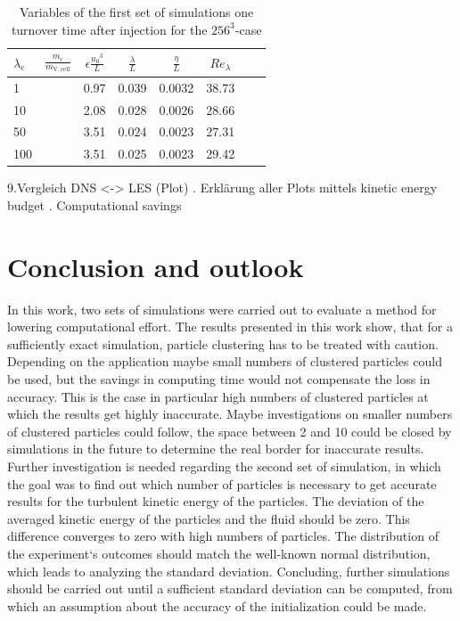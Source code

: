 \documentclass[11pt,a4paper,openany,oneside,parskip=half*]{article}
\begin{document}
\begin{table}[h]
\begin{center}
\begin{tabular}{l l | c c c c c c }
$\lambda_\mathrm{c}$& $\frac{m_\mathrm{c}}{m_\mathrm{V,cell}}$ & $\epsilon \frac{{u_0}^3}{L}$ & $\frac{\lambda}{L}$ & $\frac{\eta}{L} $ & $Re_\lambda$ \\
\hline
\hline
1 & & 0.97& 0.039 & 0.0032 & 38.73 &\\
10 & & 2.08 & 0.028 & 0.0026 & 28.66 &\\
50 & & 3.51 & 0.024 & 0.0023 & 27.31 &\\
100 & & 3.51 & 0.025 & 0.0023 & 29.42 &\\
\hline
\end{tabular}
\caption{Variables of the first set of simulations one turnover time after injection for the $256^3$-case}
\label{table_properties}
\end{center}
\end{table}
\newline
9.Vergleich DNS <-> LES (Plot)
\newline
{}. Erklärung aller Plots mittels kinetic energy budget
\newline
{}. Computational savings
\pagebreak
\section{Conclusion and outlook}
In this work, two sets of simulations were carried out to evaluate a method for lowering computational effort. 
\newline
The results presented in this work show, that for a sufficiently exact simulation, particle clustering has to be treated with caution. Depending on the application maybe small numbers of clustered particles could be used, but the savings in computing time would not compensate the loss in accuracy. This is the case in particular high numbers of clustered particles at which the results get highly inaccurate. Maybe investigations on smaller numbers of clustered particles could follow, the space between 2 and 10 could be closed by simulations in the future to determine the real border for inaccurate results. 
\newline
Further investigation is needed regarding the second set of simulation, in which the goal was to find out which number of particles is necessary to get accurate results for the turbulent kinetic energy of the particles. The deviation of the averaged kinetic energy of the particles and the fluid should be zero. This difference converges to zero with high numbers of particles. The distribution of the experiment`s outcomes should match the well-known normal distribution, which leads to analyzing the standard deviation. Concluding, further simulations should be carried out until a sufficient standard deviation can be computed, from which an assumption about the accuracy of the initialization could be made.
\pagebreak
\end{document}
